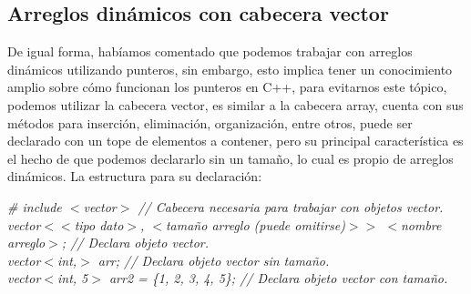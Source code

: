 \subsection{Arreglos dinámicos con cabecera vector}
\hspace{0.55cm}De igual forma, habíamos comentado que podemos trabajar con arreglos dinámicos utilizando punteros, sin embargo, esto implica tener un conocimiento amplio sobre cómo funcionan los punteros en C++, para evitarnos este tópico, podemos utilizar la cabecera vector, es similar a la cabecera array, cuenta con sus métodos para inserción, eliminación, organización, entre otros, puede ser declarado con un tope de elementos a contener, pero su principal característica es el hecho de que podemos declararlo sin un tamaño, lo cual es propio de arreglos dinámicos. La estructura para su declaración:
\begin{center}
	\textit{
		\# include $<$vector$>$ // Cabecera necesaria para trabajar con objetos vector. \\
		vector$<<$tipo dato$>$, $<$tamaño arreglo (puede omitirse)$>>$ $<$nombre arreglo$>$; // Declara objeto vector. \\
		vector$<$int,$>$ arr; // Declara objeto vector sin tamaño. \\
		vector$<$int, 5$>$ arr2 = \{1, 2, 3, 4, 5\}; // Declara objeto vector con tamaño.
	}
\end{center}

